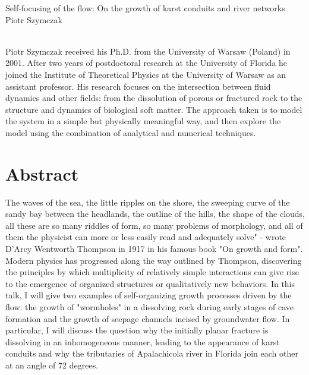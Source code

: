     { 
			{Self-focusing of the flow: On the growth of karst conduits and river networks} \\ 			
    \normalfont\small Piotr Szymczak }
    
    {  \\    
    } 
      {  } 
	\vspace{1cm} 
	Piotr Szymczak received his Ph.D. from the University of Warsaw (Poland) in 2001. After two years of postdoctoral research at the University of Florida he joined the Institute of Theoretical Physics at the University of Warsaw as an assistant professor. His research focuses on the intersection between fluid dynamics and other fields: from the dissolution of porous or fractured rock to the structure and dynamics of biological soft matter. The approach taken is to model the system in a simple but physically meaningful way, and then explore the model using the combination of analytical and numerical techniques.
	
	\section*{Abstract}
	
	The waves of the sea, the little ripples on the shore, the sweeping curve of the sandy bay between the headlands, the outline of the hills, the shape of the clouds, all these are so many riddles of form, so many problems of morphology, and all of them the physicist can more or less easily read and adequately solve" - wrote D'Arcy Wentworth Thompson in 1917 in his famous book "On growth and form". Modern physics has progressed along the way outlined by Thompson, discovering the principles by which multiplicity of relatively simple interactions can give rise to the emergence of organized structures or qualitatively new behaviors. In this talk, I will give two examples of self-organizing growth processes driven by the flow: the growth of "wormholes" in a dissolving rock during early stages of cave formation and the growth of seepage channels incised by groundwater flow. In particular, I will discuss the question why the initially planar fracture is dissolving in an inhomogeneous manner, leading to the appearance of karst conduits and why the tributaries of Apalachicola river in Florida join each other at an angle of 72 degrees.
    \vspace{.5cm}
    \newpage
    
